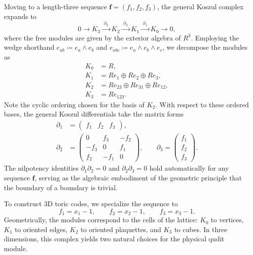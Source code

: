 \documentclass[aps,prx,english,superscriptaddress,twocolumn,tightenlines,showpacs,longbibliography,floatfix,amsfonts]{revtex4-2}
\theoremstyle{remark}
\theoremstyle{definition}
\begin{document}
Moving to a length-three sequence $\mathbf{f}=(f_1, f_2, f_3)$, the general Koszul complex expands to
\begin{equation}
	0 \longrightarrow K_3 \xrightarrow{\;\partial_3\;} K_2 \xrightarrow{\;\partial_2\;} K_1 \xrightarrow{\;\partial_1\;} K_0 \longrightarrow 0,
	\label{eq:3d-toric-koszul}
\end{equation}
where the free modules are given by the exterior algebra of $R^3$. Employing the wedge shorthand $e_{ab}\coloneqq e_a\wedge e_b$ and $e_{abc}\coloneqq e_a\wedge e_b\wedge e_c$, we decompose the modules as
\begin{equation}
	\begin{aligned}
		K_0 &= R,\\
		K_1 &= R e_1 \oplus R e_2 \oplus R e_3,\\
		K_2 &= R e_{23} \oplus R e_{31} \oplus R e_{12},\\
		K_3 &= R e_{123}.
	\end{aligned}
	\label{eq:3d-koszul-bases}
\end{equation}
Note the cyclic ordering chosen for the basis of $K_2$. With respect to these ordered bases, the general Koszul differentials take the matrix forms
\begin{subequations}
	\label{eq:3d-differentials}
	\begin{align}
		\partial_1 &= \begin{pmatrix} f_1 & f_2 & f_3 \end{pmatrix}, \\[1ex]
		\partial_2 &= \begin{pmatrix}
			0    & f_3  & -f_2\\
			-f_3  & 0    & f_1\\
			f_2   & -f_1 & 0
		\end{pmatrix}, \qquad
		\partial_3 = \begin{pmatrix} f_1\\ f_2\\ f_3 \end{pmatrix}.
		\label{eq:KC3}
	\end{align}
\end{subequations}
\noindent
The nilpotency identities $\partial_1\partial_2=0$ and $\partial_2\partial_3=0$ hold automatically for any sequence $\mathbf{f}$, serving as the algebraic embodiment of the geometric principle that the boundary of a boundary is trivial.

To construct 3D toric codes, we specialize the sequence to
\begin{equation}
	f_1=x_1-1, \qquad f_2=x_2-1, \qquad f_3=x_3-1.
\end{equation}
Geometrically, the modules correspond to the cells of the lattice: $K_0$ to vertices, $K_1$ to oriented edges, $K_2$ to oriented plaquettes, and $K_3$ to cubes. In three dimensions, this complex yields two natural choices for the physical qudit module.
\end{document}
